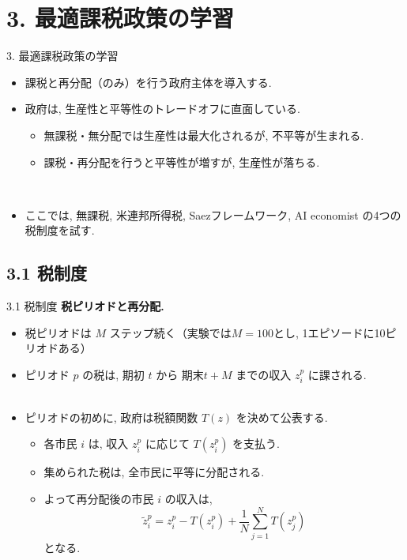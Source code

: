 \documentclass[unicode,aspectratio=169,11pt]{beamer}
\begin{document}
\section{3. 最適課税政策の学習}
\begin{frame}{3. 最適課税政策の学習}
    \begin{itemize}
        \item 課税と再分配（のみ）を行う政府主体を導入する.
        \item 政府は, 生産性と平等性のトレードオフに直面している.
        \begin{itemize}
            \item 無課税・無分配では生産性は最大化されるが, 不平等が生まれる.
            \item 課税・再分配を行うと平等性が増すが, 生産性が落ちる.
        \end{itemize}
        　\\
        \item ここでは, 無課税, 米連邦所得税, Saezフレームワーク, AI economist の4つの税制度を試す.
    \end{itemize}
\end{frame}

\subsection{3.1 税制度}
\begin{frame}{3.1 税制度}{}
{\bf 税ピリオドと再分配.}
    \begin{itemize}
        \item 税ピリオドは $M$ ステップ続く（実験では$M = 100$とし, 1エピソードに10ピリオドある）
        \item ピリオド $p$ の税は, 期初 $t$ から 期末$t + M$ までの収入 $z_i^p$ に課される.\\
                　
        \item ピリオドの初めに, 政府は税額関数 $T(z)$ を決めて公表する.
        \begin{itemize}
            \item 各市民 $i$ は, 収入 $z_i^p$ に応じて $T(z_i^p)$ を支払う.
            \item 集められた税は, 全市民に平等に分配される.
            \item よって再分配後の市民 $i$ の収入は,
            \[ \tilde{z}_i^p = z_i^p - T(z_i^p) + \frac{1}{N}\sum_{j=1}^N T\left(z_j^p\right) \tag{5}\]
            となる.
        \end{itemize}
    \end{itemize}
\end{frame}
\end{document}
